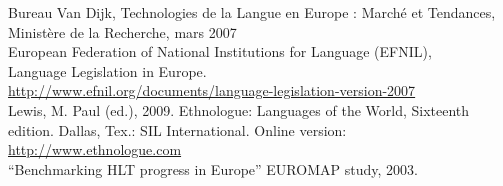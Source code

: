 
\cleardoublepage

\appendix
{}


Bureau Van Dijk, Technologies de la Langue en Europe : Marché et Tendances, Ministère de la Recherche, mars 2007\\


European Federation of National Institutions for Language (EFNIL),\\
Language Legislation in Europe.\\
\url{http://www.efnil.org/documents/language-legislation-version-2007}\\


Lewis, M. Paul (ed.), 2009. Ethnologue: Languages of the World, Sixteenth edition. Dallas, Tex.: SIL International. Online version: \url{http://www.ethnologue.com}\\


``Benchmarking HLT progress in Europe'' EUROMAP study, 2003.
\\

